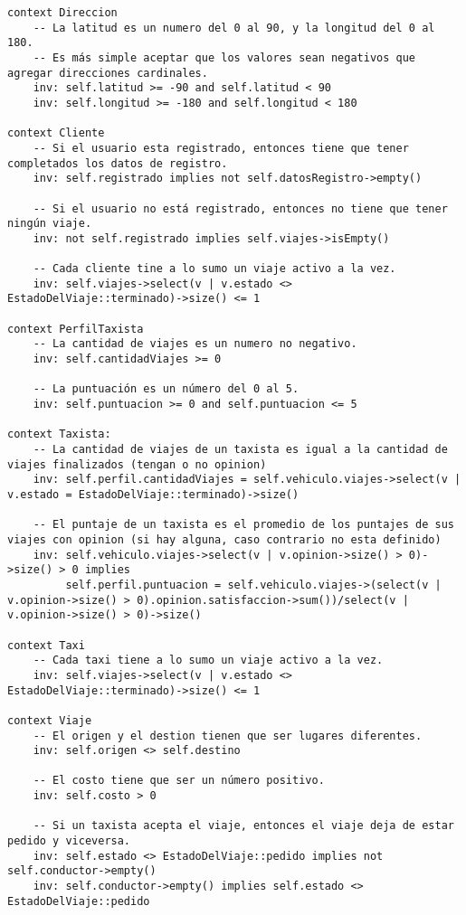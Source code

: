 \lstset{language=OCL}
\begin{lstlisting}[frame=single]
context Direccion
    -- La latitud es un numero del 0 al 90, y la longitud del 0 al 180.
    -- Es más simple aceptar que los valores sean negativos que agregar direcciones cardinales.
    inv: self.latitud >= -90 and self.latitud < 90
    inv: self.longitud >= -180 and self.longitud < 180
    
context Cliente
    -- Si el usuario esta registrado, entonces tiene que tener completados los datos de registro.
    inv: self.registrado implies not self.datosRegistro->empty()

    -- Si el usuario no está registrado, entonces no tiene que tener ningún viaje.
    inv: not self.registrado implies self.viajes->isEmpty()

    -- Cada cliente tine a lo sumo un viaje activo a la vez.
    inv: self.viajes->select(v | v.estado <> EstadoDelViaje::terminado)->size() <= 1
       
context PerfilTaxista
    -- La cantidad de viajes es un numero no negativo.
    inv: self.cantidadViajes >= 0

    -- La puntuación es un número del 0 al 5.
    inv: self.puntuacion >= 0 and self.puntuacion <= 5

context Taxista:
    -- La cantidad de viajes de un taxista es igual a la cantidad de viajes finalizados (tengan o no opinion)
    inv: self.perfil.cantidadViajes = self.vehiculo.viajes->select(v | v.estado = EstadoDelViaje::terminado)->size()

    -- El puntaje de un taxista es el promedio de los puntajes de sus viajes con opinion (si hay alguna, caso contrario no esta definido)
    inv: self.vehiculo.viajes->select(v | v.opinion->size() > 0)->size() > 0 implies
         self.perfil.puntuacion = self.vehiculo.viajes->(select(v | v.opinion->size() > 0).opinion.satisfaccion->sum())/select(v | v.opinion->size() > 0)->size()

context Taxi
    -- Cada taxi tiene a lo sumo un viaje activo a la vez.
	inv: self.viajes->select(v | v.estado <> EstadoDelViaje::terminado)->size() <= 1

context Viaje
    -- El origen y el destion tienen que ser lugares diferentes.
	inv: self.origen <> self.destino

    -- El costo tiene que ser un número positivo.
    inv: self.costo > 0

    -- Si un taxista acepta el viaje, entonces el viaje deja de estar pedido y viceversa.
    inv: self.estado <> EstadoDelViaje::pedido implies not self.conductor->empty()
    inv: self.conductor->empty() implies self.estado <> EstadoDelViaje::pedido


\end{lstlisting}
